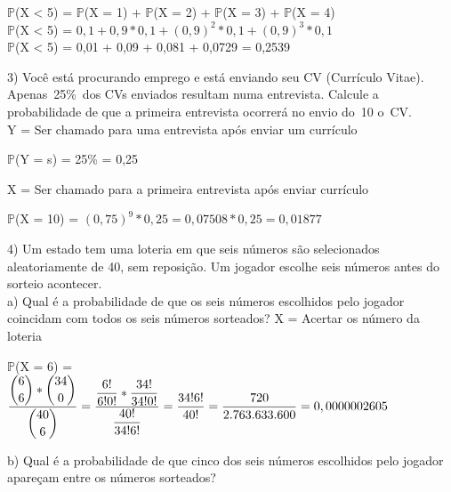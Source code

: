 \documentclass[12pt,a4paper,draft]{article}
\begin{document}
	\begin{center}
		\vspace{0.5cm}
		$\mathbb{P}$(X < 5) = $\mathbb{P}$(X = 1) + $\mathbb{P}$(X = 2) + $\mathbb{P}$(X = 3) + $\mathbb{P}$(X = 4)
		\vspace{0.5cm}\\
		$\mathbb{P}$(X < 5) = $0,1 + 0,9 * 0,1 + \left(0,9\right)^2 * 0,1 + \left(0,9\right)^3 * 0,1$ 
		\vspace{0.5cm}\\
		$\mathbb{P}$(X < 5) = 0,01 + 0,09 + 0,081 + 0,0729 = 0,2539
	\end{center}
\vspace{1cm}
	3) Você está procurando emprego e está enviando seu CV (Currículo Vitae).	Apenas 25\% dos CVs enviados resultam numa entrevista. Calcule a probabilidade de que a primeira entrevista ocorrerá no envio do 10 o CV.
	\vspace{0.5cm}\\
	Y = Ser chamado para uma entrevista após enviar um currículo
	\begin{center}
		\vspace{0.5cm}
		$\mathbb{P}$(Y = s) = 25\% = 0,25
	\end{center}
	\vspace{1cm}
	X = Ser chamado para a primeira entrevista após enviar currículo
	\begin{center}
		\vspace{0.5cm}
		$\mathbb{P}$(X = 10) = $\left(0,75\right)^9 * 0,25 = 0,07508 * 0,25 = 0,01877$ 
	\end{center}
	\vspace{1cm}
	4) Um estado tem uma loteria em que seis números são selecionados
	aleatoriamente de 40, sem reposição. Um jogador escolhe seis números antes do sorteio acontecer.\\
	a) Qual é a probabilidade de que os seis números escolhidos pelo jogador coincidam com todos os seis números sorteados?
	\vspace{0.5cm}
	X = Acertar os número da loteria
	\begin{center}
		\vspace{0.5cm}
		$\mathbb{P}$(X = 6) = $\dfrac{\dbinom{6}{6} * \dbinom{34}{0}}{\dbinom{40}{6}} = \dfrac{\dfrac{6!}{6!0!} * \dfrac{34!}{34!0!}}{\dfrac{40!}{34! 6!}} = \dfrac{34!6!}{40!} = \dfrac{720}{2.763.633.600} = 0,0000002605$
	\end{center}
	\vspace{1cm}
	b) Qual é a probabilidade de que cinco dos seis números escolhidos pelo jogador apareçam entre os números sorteados?
\end{document}
